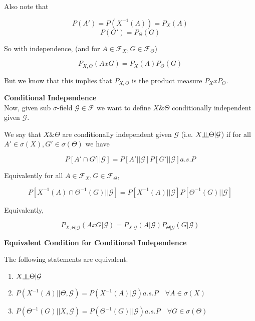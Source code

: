 \documentclass[11pt,fleqn]{book} %
\newcommand{\indep}{\rotatebox[origin=c]{90}{$\models$}}
\begin{document}
Also note that

		$$P(A') = P(X^{-1}(A)) = P_X(A) $$
		$$P(G') = P_\Theta (G) $$


So with independence, (and for $A \in \mathcal{F}_X, G \in \mathcal{F}_\Theta$)

		$$P_{X, \Theta}(A x G) = P_X (A) P_\Theta(G) $$

But we know that this implies that $P_{X, \Theta}$ is the product measure $P_X x P_\Theta$. 

\textbf{Conditional Independence}\\

Now, given sub $\sigma$-field $\mathcal{G} \in \mathcal{F}$ we want to define $X \& \Theta$ conditionally independent given $\mathcal{G}$. 

\begin{definition}
	We say that $X \& \Theta$ are conditionally independent given $\mathcal{G}$ (i.e. $X \indep \Theta | \mathcal{G}$) if for all $A' \in \sigma(X), G' \in \sigma(\Theta)$ we have 

			$$P[A' \cap G' || \mathcal{G}] = P[A' || \mathcal{G}]P[G' || \mathcal{G}] a.s. P $$

	Equivalently for all $A \in \mathcal{F}_X, G \in \mathcal{F}_\Theta$, 

			$$P[X^{-1}(A) \cap \Theta^{-1}(G) || \mathcal{G}] =P[X^{-1}(A) || \mathcal{G}]P[\Theta^{-1}(G) || \mathcal{G}]  $$

	Equivalently, 

			$$P_{X, \Theta | \mathcal{G}} (A x G | \mathcal{G}) = P_{X|\mathcal{G}}(A | \mathcal{G}) P_{\Theta|\mathcal{G}} (G | \mathcal{G}) $$
\end{definition}


\textbf{Equivalent Condition for Conditional Independence}\\

\begin{theorem}[1.1 in Notes]
	The following statements are equivalent. 

	\begin{enumerate}
		\item $X \indep \Theta | \mathcal{G}$
		\item $P(X^{-1}(A) || \Theta, \mathcal{G}) = P(X^{-1}(A)| \mathcal{G}) a.s. P \quad \forall A \in \sigma(X)$
		\item $P(\Theta^{-1}(G) || X, \mathcal{G}) = P(\Theta^{-1}(G)|| \mathcal{G}) a.s. P \quad \forall G \in \sigma(\Theta)$
	\end{enumerate}
\end{theorem}
\end{document}

